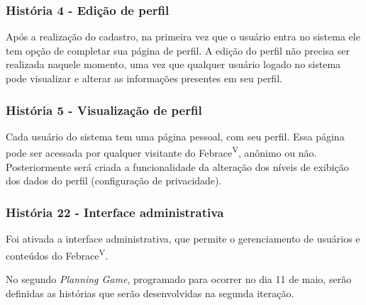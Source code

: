    \subsubsection{História 4 - Edição de perfil}
      Após a realização do cadastro, na primeira vez que o usuário entra no sistema ele tem opção de completar sua página de perfil. A edição do perfil não precisa ser realizada naquele momento, uma vez que qualquer usuário logado no sistema pode visualizar e alterar as informações presentes em seu perfil.

    \subsubsection{História 5 - Visualização de perfil}
      Cada usuário do sistema tem uma página pessoal, com seu perfil. Essa página pode ser acessada por qualquer visitante do Febrace\textsuperscript{V}, anônimo ou não. Posteriormente será criada a funcionalidade da alteração dos níveis de exibição dos dados do perfil (configuração de privacidade).

    \subsubsection{História 22 - Interface administrativa}
      Foi ativada a interface administrativa, que permite o gerenciamento de usuários e conteúdos do Febrace\textsuperscript{V}.

    No segundo \textit{Planning Game}, programado para ocorrer no dia 11 de maio, serão definidas as histórias que serão desenvolvidas na segunda iteração.
